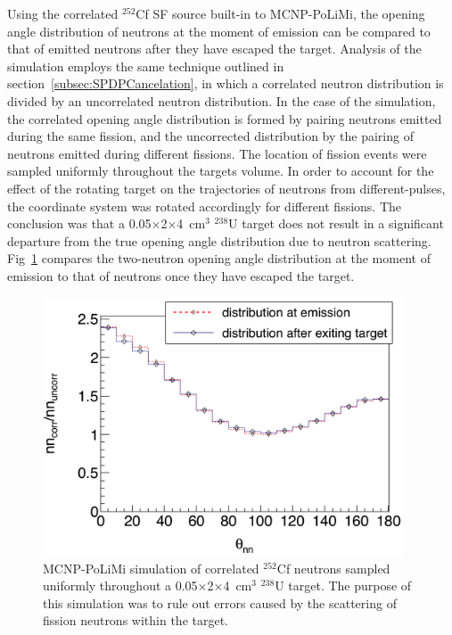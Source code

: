 Using the correlated $^{252}$Cf SF source built-in to MCNP-PoLiMi, the opening angle distribution of neutrons at the moment of emission can be compared to that of emitted neutrons after they have escaped the target.
Analysis of the simulation employs the same technique outlined in section~\ref{subsec:SPDPCancelation}, in which a correlated neutron distribution is divided by an uncorrelated neutron distribution.
In the case of the simulation, the correlated opening angle distribution is formed by pairing neutrons emitted during the same fission, and the uncorrected distribution by the pairing of neutrons emitted during different fissions.
The location of fission events were sampled uniformly throughout the targets volume.
In order to account for the effect of the rotating target on the trajectories of neutrons from different-pulses, the coordinate system was rotated accordingly for different fissions.
The conclusion was that a 0.05$\times$2$\times$4~cm$^3$ $^{238}$U target does not result in a significant departure from the true opening angle distribution due to neutron scattering.
Fig~\ref{fig:ElasticScatteringEffect} compares the two-neutron opening angle distribution at the moment of emission to that of neutrons once they have escaped the target.
\begin{figure}
    \centering
    \includegraphics[width = 0.95\textwidth]{Content/Errors/EffectOfElasticScattering.png}
    \caption{MCNP-PoLiMi simulation of correlated $^{252}$Cf neutrons sampled uniformly throughout a 0.05$\times$2$\times$4~cm$^3$ $^{238}$U target.
    The purpose of this simulation was to rule out errors caused by the scattering of fission neutrons within the target.}
    \label{fig:ElasticScatteringEffect}
\end{figure}


